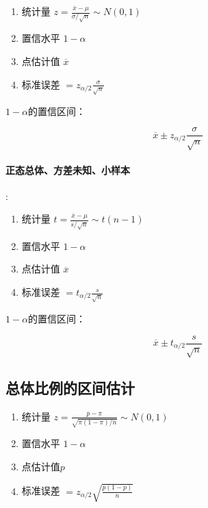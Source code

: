 \documentclass[UTF8,10pt]{book}
\begin{document}
                    {\kaishu

                    \begin{enumerate}
                        \item 统计量 $ z = \frac{\overline{x}-\mu}{\sigma / \sqrt{n}} \sim N(0,1)$
                        \item 置信水平 $1-\alpha$
                        \item 点估计值 $\overline{x}$
                        \item 标准误差 $ = z_{\alpha / 2} \frac{\sigma}{\sqrt{n}} $
                    \end{enumerate}                                  
                    }

                    $1-\alpha$的置信区间：
                    
                        $$\overline{x} \pm z_{\alpha / 2} \frac{\sigma}{\sqrt{n}}$$
                        

                \paragraph{正态总体、方差未知、小样本}:

                    {\kaishu

                    \begin{enumerate}
                        \item 统计量 $ t = \frac{\overline{x}-\mu}{s / \sqrt{n}} \sim t(n-1)$
                        \item 置信水平 $1-\alpha$
                        \item 点估计值 $\overline{x}$
                        \item 标准误差 $ = t_{\alpha / 2} \frac{s}{\sqrt{n}} $
                    \end{enumerate}                                  
                    }

                    $1-\alpha $的置信区间：
                        
                        $$ \overline{x} \pm  t_{\alpha / 2} \frac{s}{\sqrt{n}}  $$
                        


            \subsection{总体比例的区间估计}

                    {\kaishu

                    \begin{enumerate}
                        \item 统计量 $ z = \frac{p-\pi}{\sqrt{\pi (1-\pi)/n}}  \sim N(0,1)$
                        \item 置信水平 $1-\alpha$
                        \item 点估计值$p$
                        \item 标准误差 $ = z_{\alpha / 2} \sqrt{\frac{p(1-p)}{n}} $
                    \end{enumerate}                                  
                    }
\end{document}
